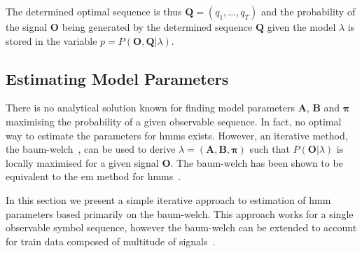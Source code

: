 The determined optimal sequence is thus $\mathbf{Q}=(q_1,...,q_T)$ and the probability of the signal $\mathbf{O}$ being generated by the determined sequence $\mathbf{Q}$ given the model $\lambda$ is stored in the variable $p = P(\mathbf{O},\mathbf{Q}|\lambda)$.

%   
%   
%   
%   
%

\subsection{Estimating Model Parameters}
\label{sec:baum-welch}
There is no analytical solution known for finding model parameters $\mathbf{A}$, $\mathbf{B}$ and $\boldsymbol{\pi}$ maximising the probability of a given observable sequence. In fact, no optimal way to estimate the parameters for \glspl{hmm} exists. However, an iterative method, the \gls{baum-welch}~\cite{baum1970}, can be used to derive $\lambda = (\mathbf{A}, \mathbf{B}, \boldsymbol{\pi})$ such that $P(\mathbf{O}|\lambda)$ is locally maximised for a given signal $\mathbf{O}$. The \gls{baum-welch} has been shown to be equivalent to the \gls{em} method for \glspl{hmm}~\cite{Dempster1977, wu1983}.

In this section we present a simple iterative approach to estimation of \gls{hmm} parameters based primarily on the \gls{baum-welch}. This approach works for a single observable symbol sequence, however the \gls{baum-welch} can be extended to account for train data composed of multitude of signals~\cite{Rabiner89hmm, levinson1983, li2000}.

